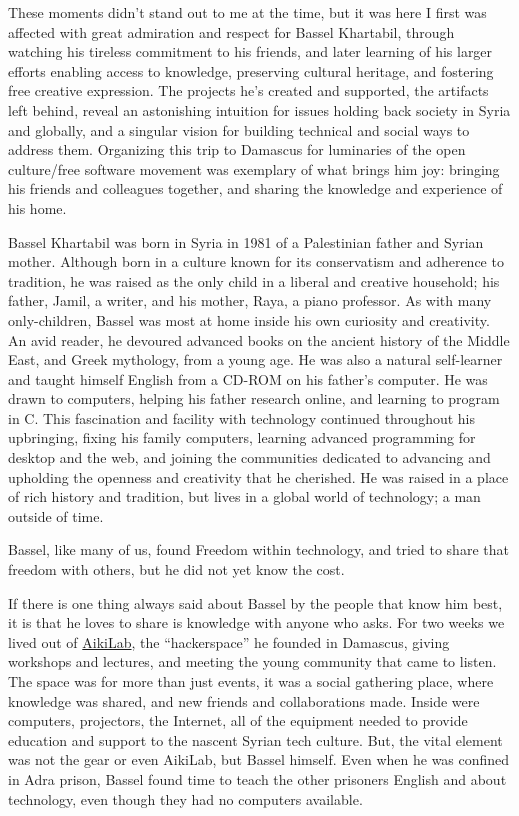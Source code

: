 These moments didn't stand out to me at the time, but it was here I
first was affected with great admiration and respect for Bassel
Khartabil, through watching his tireless commitment to his friends, and
later learning of his larger efforts enabling access to knowledge,
preserving cultural heritage, and fostering free creative expression.
The projects he's created and supported, the artifacts left behind,
reveal an astonishing intuition for issues holding back society in Syria
and globally, and a singular vision for building technical and social
ways to address them. Organizing this trip to Damascus for luminaries of
the open culture/free software movement was exemplary of what brings him
joy: bringing his friends and colleagues together, and sharing the
knowledge and experience of his home.

Bassel Khartabil was born in Syria in 1981 of a Palestinian father and
Syrian mother. Although born in a culture known for its conservatism and
adherence to tradition, he was raised as the only child in a liberal and
creative household; his father, Jamil, a writer, and his mother, Raya, a
piano professor. As with many only-children, Bassel was most at home
inside his own curiosity and creativity. An avid reader, he devoured
advanced books on the ancient history of the Middle East, and Greek
mythology, from a young age. He was also a natural self-learner and
taught himself English from a CD-ROM on his father's computer. He was
drawn to computers, helping his father research online, and learning to
program in C. This fascination and facility with technology continued
throughout his upbringing, fixing his family computers, learning
advanced programming for desktop and the web, and joining the
communities dedicated to advancing and upholding the openness and
creativity that he cherished. He was raised in a place of rich history
and tradition, but lives in a global world of technology; a man outside
of time.

Bassel, like many of us, found Freedom within technology, and tried to
share that freedom with others, but he did not yet know the cost.

If there is one thing always said about Bassel by the people that know
him best, it is that he loves to share is knowledge with anyone who
asks. For two weeks we lived out of
\href{https://wiki.hackerspaces.org/Aiki_lab}{AikiLab}, the
``hackerspace'' he founded in Damascus, giving workshops and lectures,
and meeting the young community that came to listen. The space was for
more than just events, it was a social gathering place, where knowledge
was shared, and new friends and collaborations made. Inside were
computers, projectors, the Internet, all of the equipment needed to
provide education and support to the nascent Syrian tech culture. But,
the vital element was not the gear or even AikiLab, but Bassel himself.
Even when he was confined in Adra prison, Bassel found time to teach the
other prisoners English and about technology, even though they had no
computers available.

